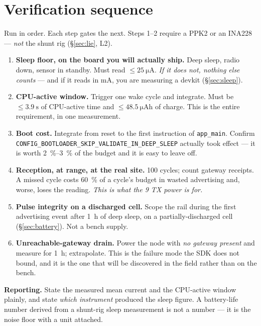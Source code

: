 \documentclass[11pt,a4paper]{article}
\begin{document}
\section{Verification sequence}

Run in order. Each step gates the next. Steps 1--2 require a PPK2 or an INA228 --- \emph{not} the
shunt rig (\S\ref{sec:lie}, L2).

\begin{enumerate}[leftmargin=*]
  \item \textbf{Sleep floor, on the board you will actually ship.} Deep sleep, radio down, sensor
        in standby. Must read $\leq\SI{25}{\micro\ampere}$. \emph{If it does not, nothing else
        counts} --- and if it reads in \si{\milli\ampere}, you are measuring a devkit
        (\S\ref{sec:sleep}).
  \item \textbf{CPU-active window.} Trigger one wake cycle and integrate. Must be
        $\leq\SI{3.9}{\second}$ of CPU-active time and $\leq\SI{48.5}{\micro\ampere\hour}$ of
        charge. This is the entire requirement, in one measurement.
  \item \textbf{Boot cost.} Integrate from reset to the first instruction of \texttt{app\_main}.
        Confirm \texttt{CONFIG\_BOOTLOADER\_SKIP\_VALIDATE\_IN\_DEEP\_SLEEP} actually took effect
        --- it is worth \SIrange{2}{3}{\percent} of the budget and it is easy to leave off.
  \item \textbf{Reception, at range, at the real site.} \num{100} cycles; count gateway receipts.
        A missed cycle costs \SI{60}{\percent} of a cycle's budget in wasted advertising and,
        worse, loses the reading. \emph{This is what the \SI{+9}{\dBm} TX power is for.}
  \item \textbf{Pulse integrity on a discharged cell.} Scope the rail during the first advertising
        event after \SI{1}{\hour} of deep sleep, on a partially-discharged cell
        (\S\ref{sec:battery}). Not a bench supply.
  \item \textbf{Unreachable-gateway drain.} Power the node with \emph{no gateway present} and
        measure for \SI{1}{\hour}; extrapolate. This is the failure mode the SDK does not bound,
        and it is the one that will be discovered in the field rather than on the bench.
\end{enumerate}

\medskip
\noindent
\textbf{Reporting.} State the measured mean current and the CPU-active window plainly, and state
\emph{which instrument} produced the sleep figure. A battery-life number derived from a shunt-rig
sleep measurement is not a number --- it is the noise floor with a unit attached.
\end{document}
